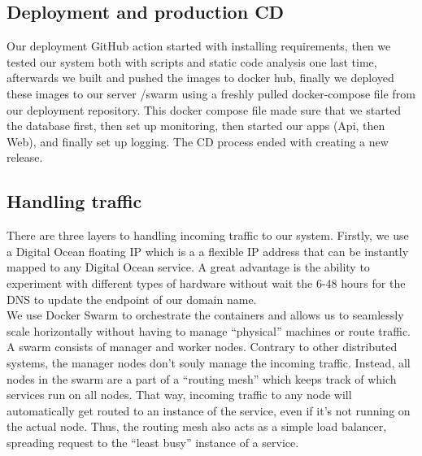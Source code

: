 \documentclass[12pt]{article}
\begin{document}

\subsection{Deployment and production CD}
Our deployment GitHub action started with installing requirements, then we tested our system both with scripts and static code analysis one last time, afterwards we built and pushed the images to docker hub, finally we deployed these images to our server /swarm using a freshly pulled docker-compose file from our deployment repository. This docker compose file made sure that we started the database first, then set up monitoring, then started our apps (Api, then Web), and finally set up logging. The CD process ended with creating a new release.
\\

\subsection{Handling traffic}
There are three layers to handling incoming traffic to our system. 
Firstly, we use a Digital Ocean floating IP which is a a flexible IP address that can be instantly mapped to any Digital Ocean service. A great advantage is the ability to experiment with different types of hardware without wait the 6-48 hours for the DNS to update the endpoint of our domain name. 
\ \\

\noindent
We use Docker Swarm to orchestrate the containers and allows us to seamlessly scale horizontally without having to manage “physical” machines or route traffic. A swarm consists of manager and worker nodes. Contrary to other distributed systems, the manager nodes don’t souly manage the incoming traffic. Instead, all nodes in the swarm are a part of a “routing mesh” which keeps track of which services run on all nodes. That way, incoming traffic to any node will automatically get routed to an instance of the service, even if it’s not running on the actual node. Thus, the routing mesh also acts as a simple load balancer, spreading request to the “least busy” instance of a service.

\end{document}
